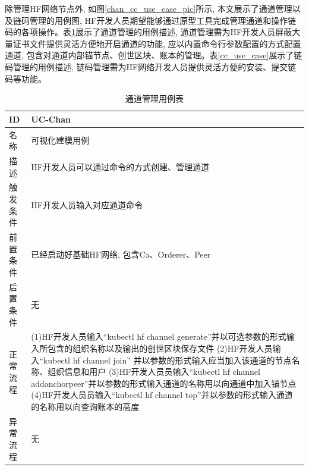 除管理HF网络节点外, 如图\ref{chan_cc_use_case_pic}所示, 本文展示了通道管理以及链码管理的用例图, HF开发人员期望能够通过原型工具完成管理通道和操作链码的各项操作。表\ref{chan_use_case}展示了通道管理的用例描述, 通道管理需为HF开发人员屏蔽大量证书文件提供灵活方便地开启通道的功能, 应以内置命令行参数配置的方式配置通道, 包含对通道内部锚节点、创世区块、账本的管理。表\ref{cc_use_case}展示了链码管理的用例描述, 链码管理需为HF网络开发人员提供灵活方便的安装、提交链码等功能。


{\footnotesize
\begin{longtable}[h]{m{60pt}|m{280pt}}
    \caption[通道管理用例表]{通道管理用例表} \label{chan_use_case} \\
        \hline  
        ID&UC-Chan\\
        \hline
        名称&可视化建模用例\\
        \hline
        描述&HF开发人员可以通过命令的方式创建、管理通道\\
        \hline
        触发条件&HF开发人员输入对应通道命令\\
        \hline
        前置条件&已经启动好基础HF网络, 包含Ca、Orderer、Peer\\
        \hline
        后置条件&无\\
        \hline
        正常流程& (1)HF开发人员输入“kubectl hf channel generate”并以可选参数的形式输入所包含的组织名称以及输出的创世区块保存文件
        \newline (2)HF开发人员输入“kubectl hf channel join” 并以参数的形式输入应当加入该通道的节点名称、组织信息和用户
        \newline (3)HF开发人员员输入“kubectl hf channel addanchorpeer”并以参数的形式输入通道的名称用以向通道中加入锚节点
        \newline (4)HF开发人员员输入“kubectl hf channel top”并以参数的形式输入通道的名称用以向查询账本的高度 \\
        \hline 
        异常流程& 无 \\
        \hline
    \end{longtable} 
}


